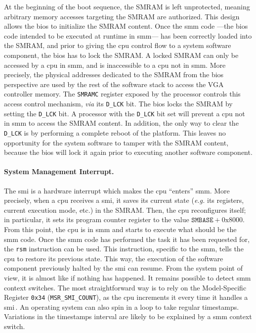 At the beginning of the boot sequence, the SMRAM is left unprotected, meaning
arbitrary memory accesses targeting the SMRAM are authorized.
%
This design allows the \ac{bios} to initialize the SMRAM content.
%
Once the \ac{smm} code ---the \ac{bios} code intended to be executed at runtime
in \ac{smm}--- has been correctly loaded into the SMRAM, and prior to giving the
\ac{cpu} control flow to a system software component, the \ac{bios} has to lock
the SMRAM.
%
A locked SMRAM can only be accessed by a \ac{cpu} in \ac{smm}, and is
inaccessible to a \ac{cpu} not in \ac{smm}.
%
More precisely, the physical addresses dedicated to the SMRAM from the \ac{bios}
perspective are used by the rest of the software stack to access the VGA
controller memory.
%
The \texttt{SMRAMC} register exposed by the processor controls this access control mechanism, \emph{via} its \texttt{D\_LCK} bit.
%
The \ac{bios} locks the SMRAM by setting the \texttt{D\_LCK} bit.
%
A processor with the \texttt{D\_LCK} bit set will prevent a \ac{cpu} not in
\ac{smm} to access the SMRAM content.
%
In addition, the only way to clear the \texttt{D\_LCK} is by performing a complete reboot of the platform.
%
This leaves no opportunity for the system software to tamper with the SMRAM
content, because the \ac{bios} will lock it again prior to executing another software component.

\paragraph{System Management Interrupt.}

The \ac{smi} is a hardware interrupt which makes the \ac{cpu} ``enters''
\ac{smm}.
%
More precisely, when a \ac{cpu} receives a \ac{smi}, it saves its current state
(\emph{e.g.} its registers, current execution mode, etc.) in the SMRAM.
%
Then, the \ac{cpu} reconfigures itself;
%
in particular, it sets its program counter register to the value
$\mathtt{SMBASE} + \mathrm{0x8000}$.
%
From this point, the \ac{cpu} is in \ac{smm} and starts to execute what should
be the \ac{smm} code.
%
Once the \ac{smm} code has performed the task it has been requested for, the
\texttt{rsm} instruction can be used.
%
This instruction, specific to the \ac{smm}, tells the \ac{cpu} to
restore its previous state.
%
This way, the execution of the software component previously halted by the
\ac{smi} can resume.
%
From the system point of view, it is almost like if nothing has happened.
%
It remains possible to detect \ac{smm} context switches.
%
The most straightforward way is to rely on the Model-Specific Register
\texttt{0x34} (\texttt{MSR\_SMI\_COUNT}), as the \ac{cpu} increments it every time it handles a \ac{smi}\,\cite[Volume 4, Chapter 2]{intel2014manual}.
%
An operating system can also spin in a loop to take regular timestamps.
%
Variations in the timestamps interval are likely to be explained by a \ac{smm}
context switch.

